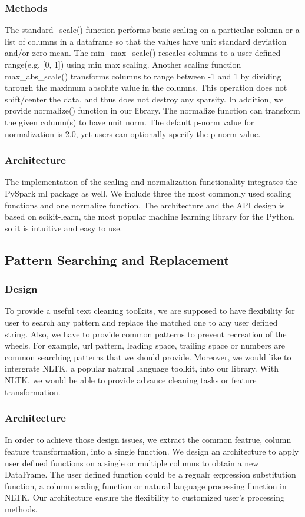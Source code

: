 \documentclass[sigconf]{acmart}
\begin{document}
\subsubsection{Methods}
The standard\_scale() function performs basic scaling on a particular column or a list of columns in a dataframe so that the values have unit standard deviation and/or zero mean. The min\_max\_scale() rescales columns to a user-defined range(e.g. [0, 1]) using min max scaling. Another scaling function max\_abs\_scale() transforms columns to range between -1 and 1 by dividing through the maximum absolute value in the columns. This operation does not shift/center the data, and thus does not destroy any sparsity. In addition, we provide normalize() function in our library. The normalize function can transform the given column(s) to have unit norm. The default p-norm value for normalization is 2.0, yet users can optionally specify the p-norm value.  
\subsubsection{Architecture}
The implementation of the scaling and normalization functionality integrates the PySpark ml package as well. We include three the most commonly used scaling functions and one normalize function. The architecture and the API design is based on scikit-learn, the most popular machine learning library for the Python, so it is intuitive and easy to use. 

\subsection{Pattern Searching and Replacement}
\subsubsection{Design} 
To provide a useful text cleaning toolkits, we are supposed to have flexibility for user to search any pattern and replace the matched one to any user defined string. Also, we have to provide common patterns to prevent recreation of the wheels. For example, url pattern, leading space, trailing space or numbers are common searching patterns that we should provide. Moreover, we would like to intergrate NLTK\cite{nltk}, a popular natural language toolkit, into our library. With NLTK, we would be able to provide advance cleaning tasks or feature transformation.

\subsubsection{Architecture}
In order to achieve those design issues, we extract the common featrue, column feature transformation, into a single function. We design an architecture to apply user defined functions on a single or multiple columns to obtain a new DataFrame. The user defined function could be a regualr expression substitution function, a column scaling function or natural language processing function in NLTK. Our architecture ensure the flexibility to customized user's processing methods.
\end{document}
